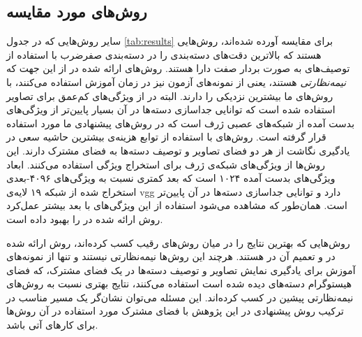 \subsection{روش‌های مورد مقایسه}\label{exp:other_methods}
سایر روش‌هایی که در جدول  \ref{tab:results} برای مقایسه آورده شده‌اند، روش‌هایی هستند که بالاترین دقت‌های دسته‌بندی را در دسته‌بندی صفرضرب با استفاده از توصیف‌های به صورت بردار صفت دارا هستند.
روش‌های ارائه شده در
\cite{li15max, semi15, Kodirov2015}
از این جهت که \textit{نیمه‌نظارتی} هستند، یعنی از  نمونه‌های آزمون نیز در زمان آموزش استفاده می‌کنند، با روش‌های ما بیشترین نزدیکی را دارند. البته در
\cite{li15max, semi15}
از ویژگی‌های کم‌عمق برای تصاویر استفاده شده است که توانایی جداسازی دسته‌ها در آن بسیار پایین‌تر از ویژگی‌های بدست آمده از شبکه‌های عصبی ژرف است که در روش‌های پیشنهادی ما مورد استفاده قرار گرفته است. روش‌های
\cite{Akata2015, Xian2016}
با استفاده از توابع هزینه‌ی بیشترین حاشیه سعی در یادگیری نگاشت از هر دو فضای تصاویر و توصیف دسته‌ها به فضای مشترک دارند. این روش‌ها از ویژگی‌های شبکه‌ی ژرف
 \cite{googlenet}
 برای استخراج ویژگی استفاده می‌کنند. ابعاد ویژگی‌های بدست آمده ۱۰۲۴ است که بعد کمتری نسبت به ویژگی‌های ۴۰۹۶-بعدی استخراج شده از شبکه ۱۹ لایه‌ی vgg دارد و توانایی جداسازی دسته‌ها در آن پایین‌تر است. همان‌طور که مشاهده می‌شود استفاده از این ویژگی‌های با بعد بیشتر عمل‌کرد روش ارائه شده در \cite{Akata2015} را بهبود داده است.

 روش‌هایی که بهترین نتایج را در میان روش‌های رقیب کسب کرده‌اند، روش ارائه شده در \cite{sse} و تعمیم آن در \cite{agnostic}  هستند. هرچند این روش‌ها نیمه‌نظارتی نیستند و تنها از نمونه‌های آموزش برای یادگیری نمایش تصاویر و توصیف دسته‌ها در یک فضای مشترک، که فضای هیستوگرام دسته‌های دیده شده است استفاده می‌کنند، نتایج بهتری نسبت به روش‌های نیمه‌نظارتی پیشین در \cite{li15max, semi15, Kodirov2015} کسب کرده‌اند. این مسئله می‌توان نشان‌گر یک مسیر مناسب در ترکیب روش پیشنهادی در این پژوهش با فضای مشترک مورد استفاده در آن روش‌ها برای کارهای آتی باشد.

